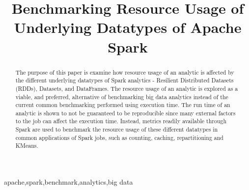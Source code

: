 \documentclass[conference]{IEEEtran}
\begin{document}
\title{Benchmarking Resource Usage of Underlying Datatypes of Apache Spark\\
}

\author{
\and
{}
\and
{}
}

\maketitle

\begin{abstract}
The purpose of this paper is examine how resource usage of an analytic is affected by the different underlying datatypes of Spark analytics -
Resilient Distributed Datasets (RDDs), Datasets, and DataFrames.
The resource usage of an analytic is explored as a viable, and preferred, alternative of benchmarking big data analytics instead of the current common benchmarking performed using execution time.
The run time of an analytic is shown to not be guaranteed to be reproducible since many external factors to the job can affect the execution time.
Instead, metrics readily available through Spark are used to benchmark the resource usage of these different datatypes in common applications of Spark jobs, such as counting, caching, repartitioning and KMeans.
\end{abstract}

\begin{IEEEkeywords}
apache,spark,benchmark,analytics,big data
\end{IEEEkeywords}
\end{document}
